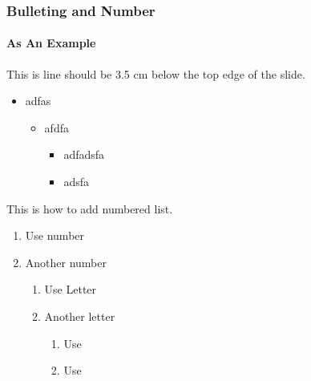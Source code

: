 \documentclass{beamer}
\begin{document}
\begin{frame} 
\frametitle{Bulleting and Number} 
\framesubtitle{As An Example}    
This is line should be 3.5 cm below the top edge of the slide.
    \begin{itemize} 
    \item adfas
        \begin{itemize}
        \item afdfa
            \begin{itemize}
            \item adfadsfa
            \item adsfa
            \end{itemize}    
        \end{itemize}
    \end{itemize}

    This is how to add numbered list.
    \begin{enumerate}
        \item Use number
        \item Another number
        \begin{enumerate}[I]
            \item Use Letter
            \item Another letter
            \begin{enumerate}[a]
                \item Use 
                \item Use
            \end{enumerate}
        \end{enumerate}
    \end{enumerate}
\end{frame}
\end{document}
